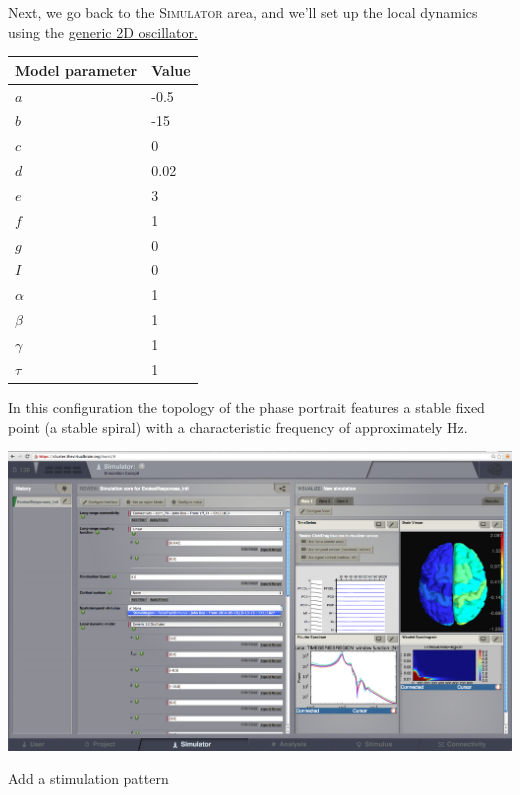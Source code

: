 \documentclass{tufte-handout}
\begin{document}
Next, we go back to the \textsc{Simulator} area, and we'll set up the local dynamics using the \underline{generic 2D oscillator.}
\begin{margintable}
  \centering
  \selectfont
  \begin{tabular}{ll}
    \toprule
    Model parameter & Value \\
    \midrule
             $a$          &   -0.5   \\
             $b$          &  -15    \\
             $c$           &   0        \\
             $d$           &   0.02    \\
             $e$           &   3        \\
             $f$            &   1    \\
             $g$           &   0        \\
             $I$            &   0        \\
             $\alpha$   &   1        \\
             $\beta$     &   1     \\
             $\gamma$&   1       \\
             $\tau$       &   1 \\
    \bottomrule
  \end{tabular}
  \caption{In this configuration the topology of the phase portrait features a stable fixed point (a stable spiral) with a characteristic frequency of approximately \unit[10]{Hz}. }
  \label{tab:modeltab}
\end{margintable}
\begin{marginfigure}
  \includegraphics[width=\linewidth]{Handout_UI_HeterogenousModelAndStimulation_RegionAddStimulus}%
  \caption{Add a stimulation pattern}%
  \label{fig:add_stimulus}%
\end{marginfigure}
\end{document}
